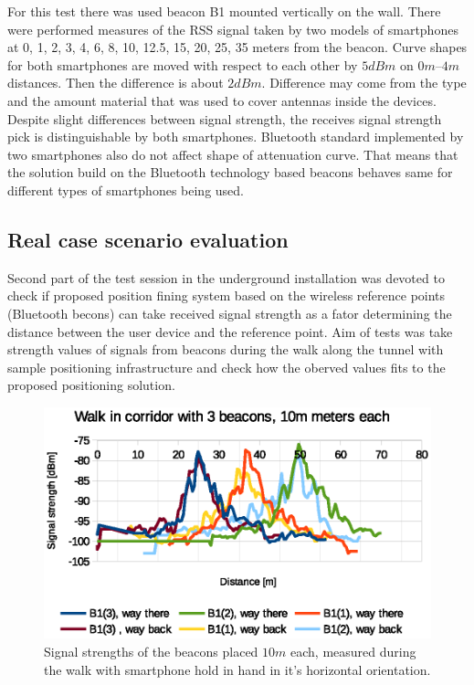 \documentclass[../main.tex]{subfiles}
\begin{document}
For this test there was used beacon B1 mounted vertically on the wall. There were performed measures of the RSS signal taken by two models of smartphones at 0, 1, 2, 3, 4, 6, 8, 10, 12.5, 15, 20, 25, 35 meters from the beacon. Curve shapes for both smartphones are moved with respect to each other by $5dBm$ on $0m$--$4m$ distances. Then the difference is about $2dBm$. Difference may come from the type and the amount material that was used to cover antennas inside the devices. Despite slight differences between signal strength, the receives signal strength pick is distinguishable by both smartphones. Bluetooth standard implemented by two smartphones also do not affect shape of attenuation curve. That means that the solution build on the Bluetooth technology based beacons behaves same for different types of smartphones being used.

\FloatBarrier
\subsection{Real case scenario evaluation} %
\label{sub:real_case_scenario_evaluation}

Second part of the test session in the underground installation was devoted to check if proposed position fining system based on the wireless reference points (Bluetooth becons) can take received signal strength as a fator determining the distance between the user device and the reference point. Aim of tests was take strength values of signals from beacons during the walk along the tunnel with sample positioning infrastructure and check how the oberved values fits to the proposed positioning solution.

\begin{figure}[!htbp]
\includegraphics[width=\textwidth, keepaspectratio]{pictures/tests_case10_walk_10m_raw}
\centering
\caption{Signal strengths of the beacons placed $10m$ each, measured during the walk with smartphone hold in hand in it's horizontal orientation.}
\label{fig:tests_case10_walk_10m_raw}
\end{figure}
\end{document}
